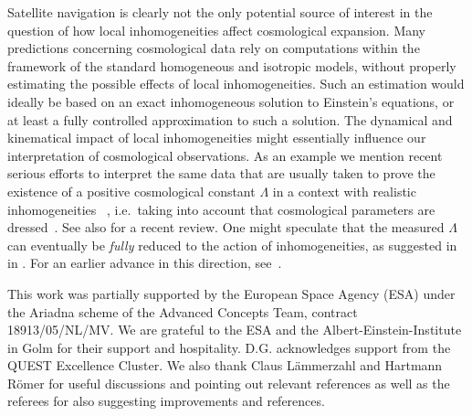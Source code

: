\documentclass
[rmp,aps,twocolumn,showpacs,preprintnumbers,amsmath,amssymb]{revtex4}
\theoremstyle{plain}
\theoremstyle{definition}
\theoremstyle{remark}
\begin{document}
Satellite navigation is clearly not the only potential source of 
interest in the question of how local inhomogeneities affect
cosmological expansion. Many predictions concerning cosmological 
data rely on computations within the framework of the standard 
homogeneous and isotropic models, without properly estimating the 
possible effects of local inhomogeneities. Such an estimation would 
ideally be based on an exact inhomogeneous solution to Einstein's 
equations, or at least a fully controlled approximation to such a 
solution.  The dynamical and kinematical impact of local 
inhomogeneities might essentially influence our interpretation of 
cosmological observations. As an example we mention recent serious 
efforts to interpret the same data that are usually taken to prove the 
existence of a positive cosmological constant $\Lambda$ in a context 
with realistic inhomogeneities~%
\cite{Buchert:2000,Rasanen:2006,Wiltshire:2007}, 
i.e.~taking into account that cosmological parameters are 
dressed~\cite{Buchert.Carfora:2003}. See also \cite{Buchert:2008}
for a recent review. One might speculate that the measured $\Lambda$ 
can eventually be \emph{fully} reduced to the action of inhomogeneities, 
as suggested in in \cite{Wiltshire:2007,Wiltshire:2008}. 
For an earlier advance in this direction, see~\cite{Celerier:2000}.  


\begin{acknowledgments}
This work was partially supported by the European Space Agency (ESA) under 
the Ariadna scheme of the Advanced Concepts Team, contract 18913/05/NL/MV. 
We are grateful to the ESA and the Albert-Einstein-Institute in Golm for 
their support and hospitality. D.G. acknowledges support from the QUEST 
Excellence Cluster. 
We also thank Claus L\"ammerzahl and Hartmann R\"omer for useful discussions 
and pointing out relevant references as well as the referees for also 
suggesting improvements and references. 
\end{acknowledgments}




\appendix
\end{document}

